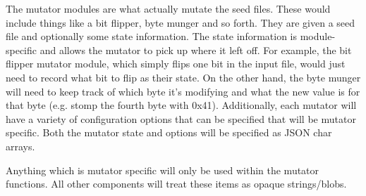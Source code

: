 The mutator modules are what actually mutate the seed files.  These would
include things like a bit flipper, byte munger and so forth.  They are given a
seed file and optionally some state information.  The state information is
module-specific and allows the mutator to pick up where it left off.  For
example, the bit flipper mutator module, which simply flips one bit in the input
file, would just need to record what bit to flip as their state.  On the other
hand, the byte munger will need to keep track of which byte it's modifying and
what the new value is for that byte (e.g.  stomp the fourth byte with 0x41).
Additionally, each mutator will have a variety of configuration options that can
be specified that will be mutator specific.  Both the mutator state and options
will be specified as JSON char arrays.

\par
Anything which is mutator specific will only be used within the mutator
functions.  All other components will treat these items as opaque strings/blobs.




